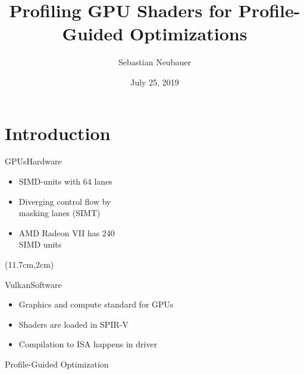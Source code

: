 \documentclass[xcolor={usenames,dvipsnames}, aspectratio=169, 12pt]{beamer}
\title[Master Thesis]{Profiling GPU Shaders for Profile-Guided Optimizations}
\author[S. Neubauer]{Sebastian Neubauer}
\date{July 25, 2019}
\institute{Technische Universität München}
\begin{document}
\frame[plain]{\titlepage}

\section{Introduction}

\begin{frame}{GPUs}{Hardware}
\begin{itemize}
	\item SIMD-units with 64 lanes
	\item Diverging control flow by\\masking lanes (SIMT)
	\item AMD Radeon VII has 240\\SIMD units
\end{itemize}
%	
\begin{textblock*}{5cm}(11.7cm,2cm)

\end{textblock*}
\end{frame}

{\framelogo{\centering}
\begin{frame}{Vulkan}{Software}
\begin{itemize}
	\item Graphics and compute standard for GPUs
	\item Shaders are loaded in SPIR-V
	\item Compilation to ISA happens in driver
\end{itemize}
\end{frame}}

\begin{frame}{}{Profile-Guided Optimization}

\end{frame}
\end{document}
